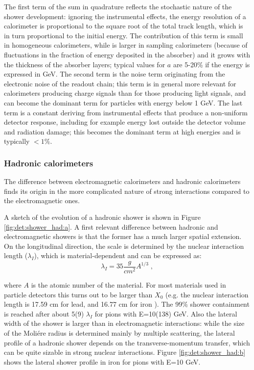 \noindent The first term of the sum in quadrature reflects the stochastic nature of the shower development: ignoring the instrumental effects, the energy resolution of a calorimeter is proportional to the square root of the total track length, which is in turn proportional to the initial energy. The contribution of this term is small in homogeneous calorimeters, while is larger in sampling calorimeters (because of fluctuations in the fraction of energy deposited in the absorber) and it grows with the thickness of the absorber layers; typical values for $a$ are 5-20\% if the energy is expressed in GeV. The second term is the noise term originating from the electronic noise of the readout chain; this term is in general more relevant for calorimeters producing charge signals than for those producing light signals, and can become the dominant term for particles with energy below 1 GeV. The last term is a constant deriving from instrumental effects that produce a non-uniform detector response, including for example energy lost outside the detector volume and radiation damage; this becomes the dominant term at high energies and is typically $<1\%$. 



\subsubsection*{Hadronic calorimeters}

The difference between electromagnetic calorimeters and hadronic calorimeters finds its origin in the more complicated nature of strong interactions compared to the electromagnetic ones. 

A sketch of the evolution of a hadronic shower is shown in Figure \ref{fig:det:shower_had:a}. A first relevant difference between hadronic and electromagnetic showers is that the former has a much larger spatial extension. On the longitudinal direction, the scale is determined by the nuclear interaction length ($\lambda_I$), which is material-dependent and can be expressed as:
\begin{equation}
\lambda_I = 35 \frac{g}{cm^2} A^{1/3} \; , \nonumber
\end{equation}

\noindent where $A$ is the atomic number of the material. For most materials used in particle detectors this turns out to be larger than $X_0$ (e.g. the nuclear interaction length is 17.59 cm for lead, and 16.77 cm for iron \cite{Patrignani:2016xqp}). The 99\% shower containment is reached after about 5(9) $\lambda_I$ for pions with E=10(138) GeV. Also the lateral width of the shower is larger than in electromagnetic interactions: while the size of the Moli\'ere radius is determined mainly by multiple scattering, the lateral profile of a hadronic shower depends on the transverse-momentum transfer, which can be quite sizable in strong nuclear interactions. Figure \ref{fig:det:shower_had:b} shows the lateral shower profile in iron for pions with E=10 GeV.

